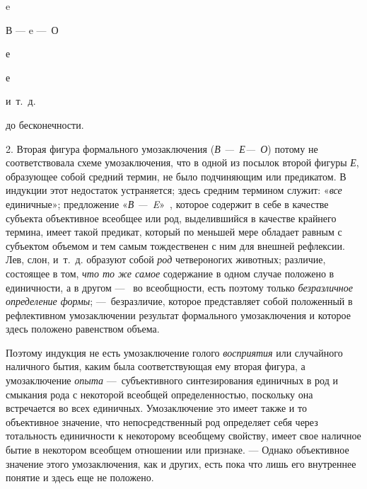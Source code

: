 \documentclass[twoside]{article}
\begin{document}
{{{{{{\centering
e
\par}

{\centering
В — e —~О
\par}

{\centering
е
\par}

{\centering
е
\par}

{\centering
и~т.~д.
\par}

{\centering
до бесконечности.
\par}

2. Вторая фигура формального умозаключения
({\em В —~Е—~О}) потому не соответствовала схеме
умозаключения, что в одной из посылок второй фигуры
{\em Е}, образующее собой
средний термин, не было подчиняющим или предикатом. В индукции этот
недостаток устраняется; здесь средним термином служит:
«{\em все} единичные»;
предложение «{\em В
—~E}»~\label{bkm:bm57},
которое содержит в себе в качестве субъекта объективное
всеобщее или род, выделившийся в качестве крайнего термина, имеет такой
предикат, который по меньшей мере обладает равным с субъектом объемом и тем
самым тождественен с ним для внешней рефлексии. Лев, слон, и~т.~д. образуют
собой {\em род}
четвероногих животных; различие, состоящее в том,
{\em что то же самое}
содержание в одном случае положено в единичности, а в другом
—~ во всеобщности, есть поэтому только
{\em безразличное определение формы};
—~безразличие, которое представляет собой положенный в
рефлективном умозаключении результат формального умозаключения и которое
здесь положено равенством объема.

Поэтому индукция не есть умозаключение голого
{\em восприятия} или
случайного наличного бытия, каким была соответствующая ему вторая фигура, а
умозаключение {\em опыта}
—~субъективного синтезирования единичных в род и смыкания
рода с некоторой всеобщей определенностью, поскольку она встречается во
всех единичных. Умозаключение это имеет также и то объективное значение,
что непосредственный род определяет себя через тотальность единичности к
некоторому всеобщему свойству, имеет свое наличное бытие в некотором
всеобщем отношении или признаке. — Однако объективное
значение этого умозаключения, как и других, есть пока что лишь его
внутреннее понятие и здесь еще не положено.

}}}}}
\end{document}
